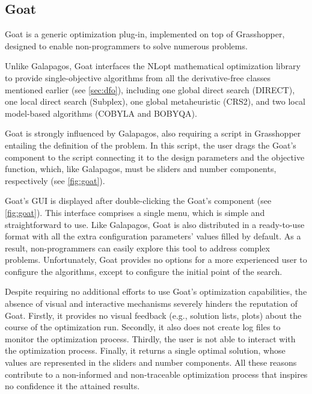 	\subsection{Goat}
	Goat \cite{GOAT} is a generic optimization plug-in, implemented on top of Grasshopper, designed to enable non-programmers to solve numerous problems.
	
	Unlike Galapagos, Goat interfaces the NLopt mathematical optimization library~\cite{NLOPT} to provide single-objective algorithms from all the derivative-free classes mentioned earlier (see \cref{sec:dfo}), including one global direct search (DIRECT), one local direct search (Subplex), one global metaheuristic (CRS2), and two local model-based algorithms (COBYLA and BOBYQA). 
	
	Goat is strongly influenced by Galapagos, also requiring a script in Grasshopper entailing the definition of the problem. In this script, the user drags the Goat's component to the script connecting it to the design parameters and the objective function, which, like Galapagos, must be sliders and number components, respectively (see \cref{fig:goat}).
	
	Goat's \ac{GUI} is displayed after double-clicking the Goat's component (see \cref{fig:goat}). This interface comprises a single menu, which is simple and straightforward to use. Like Galapagos, Goat is also distributed in a ready-to-use format with all the extra configuration parameters' values filled by default. As a result, non-programmers can easily explore this tool to address complex problems. Unfortunately, Goat provides no options for a more experienced user to configure the algorithms, except to configure the initial point of the search.
	
	Despite requiring no additional efforts to use Goat's optimization capabilities, the absence of visual and interactive mechanisms severely hinders the reputation of Goat. Firstly, it provides no visual feedback (e.g., solution lists, plots) about the course of the optimization run. Secondly, it also does not create log files to monitor the optimization process. Thirdly, the user is not able to interact with the optimization process. Finally, it returns a single optimal solution, whose values are represented in the sliders and number components. All these reasons contribute to a non-informed and non-traceable optimization process that inspires no confidence it the attained results. 
	
